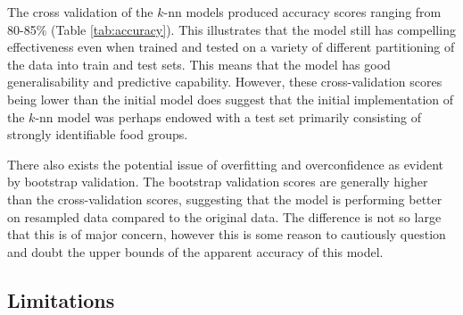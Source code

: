 \documentclass[11pt]{article}
\begin{document}
The cross validation of the $k$-nn models produced accuracy scores ranging from 80-85\% (Table \ref{tab:accuracy}). This illustrates that the model still has compelling effectiveness even when trained and tested on a variety of different partitioning of the data into train and test sets. This means that the model has good generalisability and predictive capability. However, these cross-validation scores being lower than the initial model does suggest that the initial implementation of the $k$-nn model was perhaps endowed with a test set primarily consisting of strongly identifiable food groups.

There also exists the potential issue of overfitting and overconfidence as evident by bootstrap validation. The bootstrap validation scores are generally higher than the cross-validation scores, suggesting that the model is performing better on resampled data compared to the original data. The difference is not so large that this is of major concern, however this is some reason to cautiously question and doubt the upper bounds of the apparent accuracy of this model. 


\subsection{Limitations}

\end{document}
